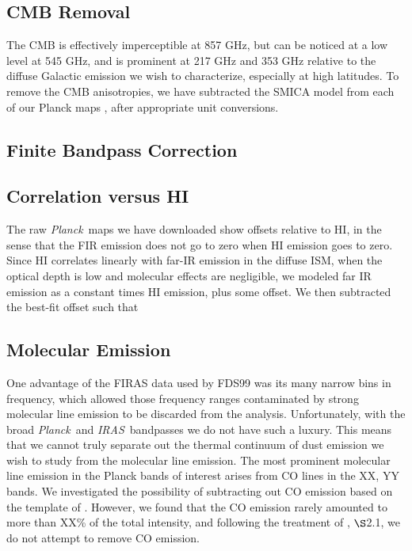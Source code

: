 \documentclass{emulateapj}
\newcommand{\IRAS}{{\it IRAS}}
\newcommand{\PLANCK}{{\it Planck}}
\begin{document}

\subsection{CMB Removal}
The CMB is effectively imperceptible at 857 GHz, but can be noticed at a 
low level at 545 GHz, and is prominent at 217 GHz and 353 GHz relative 
to the diffuse Galactic emission we wish to characterize, especially at high
latitudes. To remove the CMB anisotropies, we have subtracted the SMICA model
from each of our Planck maps \citep{smica}, after appropriate unit conversions.

\subsection{Finite Bandpass Correction}


\subsection{Correlation versus HI}
The raw \PLANCK~maps we have downloaded show offsets relative to HI, in the
sense that the FIR emission does not go to zero when HI emission goes to
zero. Since HI correlates linearly with far-IR emission in the diffuse ISM, 
when the optical depth is low and molecular effects are negligible, we modeled
far IR emission as a constant times HI emission, plus some offset. We then
subtracted the best-fit offset such that 

\subsection{Molecular Emission}
One advantage of the FIRAS data used by FDS99 was its many narrow bins in 
frequency, which allowed those frequency ranges contaminated by strong 
molecular line emission to be discarded from the analysis. Unfortunately, with 
the broad \PLANCK~and \IRAS~bandpasses we do not have such a luxury. This means
 that we cannot truly separate out the thermal continuum of dust emission we 
wish to study from the molecular line emission. The most prominent molecular 
line emission in the Planck bands of interest arises from CO lines in the XX, 
YY bands. We investigated the possibility of subtracting out CO emission based 
on the template of \cite{planckco}. However, we found that the CO emission
rarely amounted to more than XX\% of the total intensity, and following
the treatment of \cite{planckdust}, $\S$2.1, we do not attempt to remove CO
emission.
\end{document}
